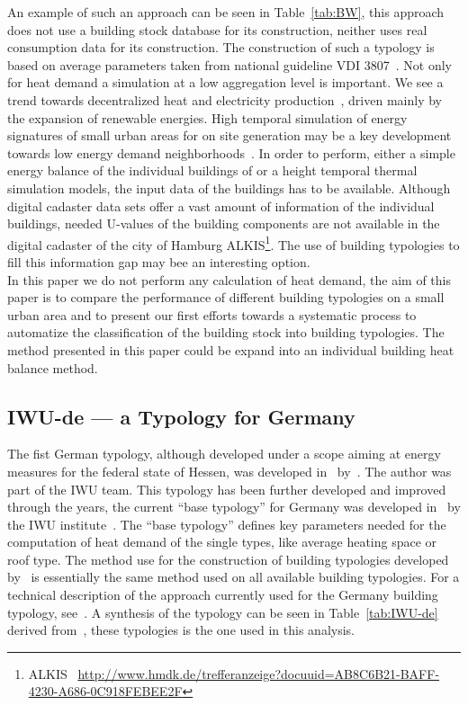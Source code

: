 \documentclass[authoryear,preprint,review,12pt]{elsarticle}
\begin{document}
\begin{linenumbers}
An example of such an approach can be seen in Table~\ref{tab:BW}, this approach
does not use a building stock database for its construction, neither uses real
consumption data for its construction.  The construction of such a typology is
based on average parameters taken from national guideline VDI
3807~\cite{VDI-3807.1994}.  Not only for heat demand a simulation at a low
aggregation level is important.  We see a trend towards decentralized heat and
electricity production~\cite{KEMA.2012}, driven mainly by the expansion of
renewable energies. High temporal simulation of energy signatures of small
urban areas for on site generation may be a key development towards low energy
demand neighborhoods~\cite{Koch.2013}.  In order to perform, either a simple
energy balance of the individual buildings of or a height temporal thermal
simulation models, the input data of the buildings has to be available.
Although digital cadaster data sets offer a vast amount of information of the
individual buildings, needed U-values of the building components are not
available in the digital cadaster of the city of Hamburg
ALKIS\footnote{ALKIS~\cite{adv.2008}
\url{http://www.hmdk.de/trefferanzeige?docuuid=AB8C6B21-BAFF-4230-A686-0C918FEBEE2F}}.
The use of building typologies to fill this information gap may bee an
interesting option.\\



In this paper we do not perform any calculation of heat demand, the aim of this
paper is to compare the performance of different building typologies on a small
urban area and to present our first efforts towards a systematic process to
automatize the classification of the building stock into building typologies.
The method presented in this paper could be expand into an individual building
heat balance method.\\

\subsection{IWU-de --- a Typology for Germany}\label{sub-sec:IWU-de}

The fist German typology, although developed under a scope aiming at energy
measures for the federal state of Hessen, was developed in~\citeyear{Ebel.1990}
by~\citeauthor{Ebel.1990}. The author was part of the IWU team.  This typology
has been further developed and improved through the years, the current ``base
typology'' for Germany was developed in~\citeyear{IWU.2003} by the IWU
institute~\cite{IWU.2003}.  The ``base typology'' defines key parameters
needed for the computation of heat demand of the single types, like average
heating space or roof type.  The method use for the construction of
building typologies developed by~\cite{Ebel.1990} is essentially the same
method used on all available building typologies.  For a technical description
of the approach currently used for the Germany building typology,
see~\cite{Loga.2012}.  A synthesis of the typology can be seen in
Table~\ref{tab:IWU-de} derived from~\cite{Loga.2011}, these typologies is the one
used in this analysis.\\


\end{linenumbers}
\end{document}
